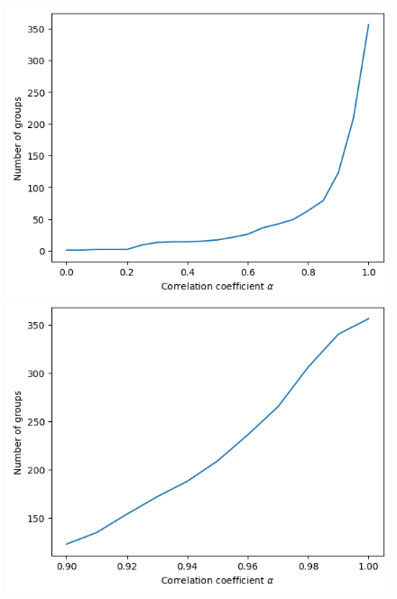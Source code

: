 \begin{figure}
	\centering
	\begin{minipage}{0.45\textwidth}
		\centering
		\includegraphics[width=\textwidth,height=\textheight,keepaspectratio]{img/alpha_groups_0.0_0.95.png}
		\subcaption{$\alpha\in[0.00,0.95]$}
	\end{minipage}
	\begin{minipage}{0.45\textwidth}
		\centering
		\includegraphics[width=\textwidth,height=\textheight,keepaspectratio]{img/alpha_groups_9.0_9.9.png}
		\subcaption{$\alpha\in[0.90,0.99]$}
	\end{minipage}
	\begin{minipage}{\textwidth}
		\centering
		\begin{tabular}{c|c|c|c|c|c|c|c|c|c|c}

\end{tabular}
\end{minipage}
\end{figure}
